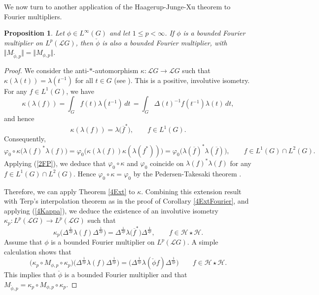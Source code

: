 \documentclass[12pt]{amsart}
\renewcommand{\H}{\mbox{${\mathcal H}$}}
\newcommand{\norm}[1]{\Vert#1\Vert}
\newtheorem{proposition}[theorem]{Proposition}
\theoremstyle{remark}
\theoremstyle{definition}
\numberwithin{equation}{section}
\begin{document}
We now turn to another application of the Haagerup-Junge-Xu theorem to Fourier multipliers.

\begin{proposition}\label{4Antipode}
Let $\phi\in L^\infty(G)$ and let $1\leq p<\infty$. If $\phi$ is a bounded Fourier multiplier on
$L^p({\mathcal L}G)$, then $\check{\phi}$ is also a bounded Fourier multiplier, with
$\norm{M_{\check{\phi},p}}= \norm{M_{\phi,p}}$.
\end{proposition}

\begin{proof}
We consider the anti-$*$-automorphism $\kappa\colon {\mathcal L}G\to {\mathcal L}G$ such
that $\kappa(\lambda(t))=\lambda(t^{-1})$ for all $t\in G$
(see \cite[Theorem 3.3.6]{EnockS}). 
This is a positive, involutive isometry.
For any $f\in L^1(G)$, we have
$$
\kappa(\lambda(f))=\int_G f(t)\lambda(t^{-1})\, dt\, = \int_G\Delta(t)^{-1}f(t^{-1})\lambda(t)\,dt,
$$
and hence
\begin{equation}\label{4Kappa}
\kappa(\lambda(f))=\lambda\bigl(\overline{f}^*\bigr),\qquad f\in L^1(G).
\end{equation}
Consequently,
$$
\varphi_0\circ\kappa\bigl(\lambda(f)^*\lambda(f)\bigr)
=\varphi_0\bigl(\kappa(\lambda(f))\kappa(\lambda(f^*))\bigr)
=\varphi_0\bigl(\lambda(\overline{f})^*\lambda(\overline{f})\bigr),\qquad f\in L^1(G)\cap L^2(G).
$$
Applying (\ref{2FP}), we deduce that $\varphi_0\circ\kappa$ and $\varphi_0$ coincide
on $\lambda(f)^*\lambda(f)$ for any  $f\in L^1(G)\cap L^2(G)$.  
Hence $\varphi_0\circ\kappa=\varphi_0$ by  the 
Pedersen-Takesaki theorem \cite[Theorem 6.2]{Stra}.





Therefore, we can apply  Theorem \ref{4Ext} to $\kappa$.
Combining  this extension result with Terp's interpolation theorem as in the proof of 
Corollary \ref{4ExtFourier}, and applying (\ref{4Kappa}), we deduce the existence of an involutive isometry
$\kappa_p\colon L^p({\mathcal L}G)\to L^p({\mathcal L}G)$ such that
$$
\kappa_p\bigl(\Delta^{\frac{1}{2p}} \lambda (f) \Delta^{\frac{1}{2p}}\bigr)
=\Delta^{\frac{1}{2p}}\lambda\bigl(\overline{f}^*\bigr) \Delta^{\frac{1}{2p}},\qquad
f\in\H\star \H.
$$
Assume that $\phi$ is a bounded Fourier multiplier on
$L^p({\mathcal L}G)$. A simple calculation shows that 
$$
\bigl(\kappa_p\circ M_{\phi,p}\circ\kappa_p\bigr)\bigl(\Delta^{\frac{1}{2p}} \lambda (f) \Delta^{\frac{1}{2p}}\bigr)
=\bigl(\Delta^{\frac{1}{2p}} \lambda (\check{\phi} f) \Delta^{\frac{1}{2p}}\bigr)\qquad
f\in\H\star \H.
$$
This implies that $\check{\phi}$ is a bounded Fourier multiplier and that 
$M_{\check{\phi},p}=\kappa_p\circ M_{\phi,p}\circ \kappa_p.$
\end{proof}
\end{document}
